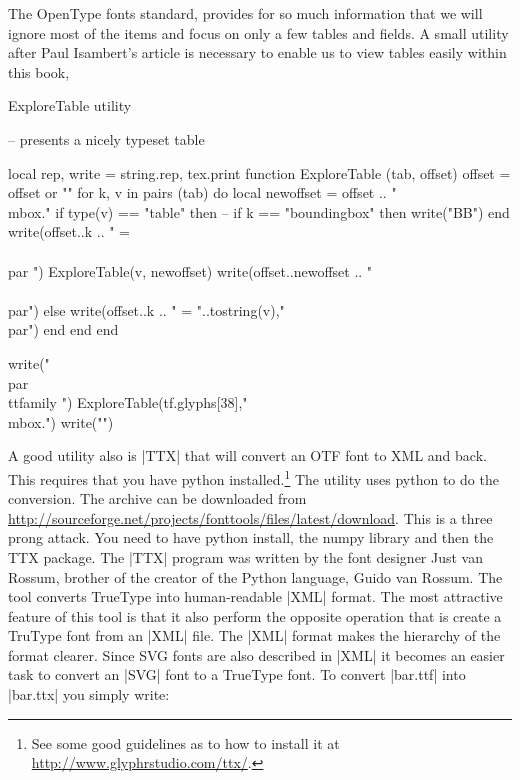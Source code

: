 The OpenType fonts standard, provides for so much information that we will ignore most of the items and focus on only a few tables and fields. A small utility after Paul Isambert's article is necessary to enable us to view tables easily within this book,


\begin{texexample}{ExploreTable utility}{}
\begin{luacode*}
-- presents a nicely typeset table 

local rep, write = string.rep, tex.print
function ExploreTable (tab, offset)
    offset = offset or ""
    for k, v in pairs (tab) do
        local newoffset = offset .. "\\mbox{.}"
        if type(v) == "table" then
           -- if k == "boundingbox" then write("BB") end
           write(offset..k .. " = \\{\\par ")
           ExploreTable(v, newoffset)
           write(offset..newoffset .. "\\}\\par")
         else
           write(offset..k .. " = "..tostring(v),"\\par")
         end
      end
end

write("\\par{\\ttfamily ")
ExploreTable(tf.glyphs[38],"\\mbox{.}")
write("}")
  \end{luacode*}
\end{texexample}

A good utility also is |TTX| that will convert an OTF font to XML and back. This requires that you have python installed.\footnote{See some good guidelines as to how to install it at \url{http://www.glyphrstudio.com/ttx/}.} The utility uses python to do the conversion. The archive can be downloaded from \url{http://sourceforge.net/projects/fonttools/files/latest/download}. This is a three prong attack. You need to have python install, the numpy library and then the TTX package. The |TTX| program was written by the font designer Just van Rossum, brother of the creator of the Python language, Guido van Rossum. The tool converts TrueType into human-readable |XML| format. The most attractive feature of this tool is that it also perform the opposite operation that is create a TruType font from an |XML| file. The |XML| format makes the hierarchy of the format clearer. Since SVG fonts are also described in |XML| it becomes an easier task to convert an |SVG| font to a TrueType font. To convert |bar.ttf| into |bar.ttx| you simply write:

